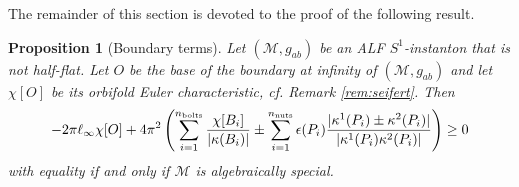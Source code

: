 \documentclass[a4paper,11pt,reqno]{amsart}
\newcommand{\nut}{P}
\newcommand{\bolt}{B}
\newcommand{\cM}{\mathcal{M}}
\theoremstyle{plain}
\newtheorem{prop}[thm]{Proposition}
\newcommand{\nnuts}{n_{\text{\rm nuts}}}
\newcommand{\nbolts}{n_{\text{\rm bolts}}}
\numberwithin{equation}{section}
\newcommand{\eps}{\epsilon}
\begin{document}
The remainder of this section is devoted to the proof of the following result.
\begin{prop}[Boundary terms] \label{prop:magbound} 
Let $(\cM, g_{ab})$ be an ALF $S^1$-instanton that is not half-flat. Let $O$ be the base of the boundary at infinity of $(\cM, g_{ab})$ and let $\chi[O]$ be its orbifold Euler characteristic, cf. Remark \ref{rem:seifert}.  Then
\begin{align}  \label{eq:magbound}
-2\pi \ell_\infty \chi[O]
+4\pi^2 \left(
\sum_{i=1}^{\nbolts} \frac{\chi[\bolt_i]}{|\kappa(\bolt_i)|}
\pm\sum_{i=1}^{\nnuts} \eps(\nut_i)
\frac{|\kappa^1(\nut_i) \pm \kappa^2(\nut_i)|}{|\kappa^1(\nut_i)\kappa^2(\nut_i)|}
\right)
\geq 0
\end{align}
with equality if and only if $\cM$ is algebraically special.
\end{prop} 
%
\end{document}

